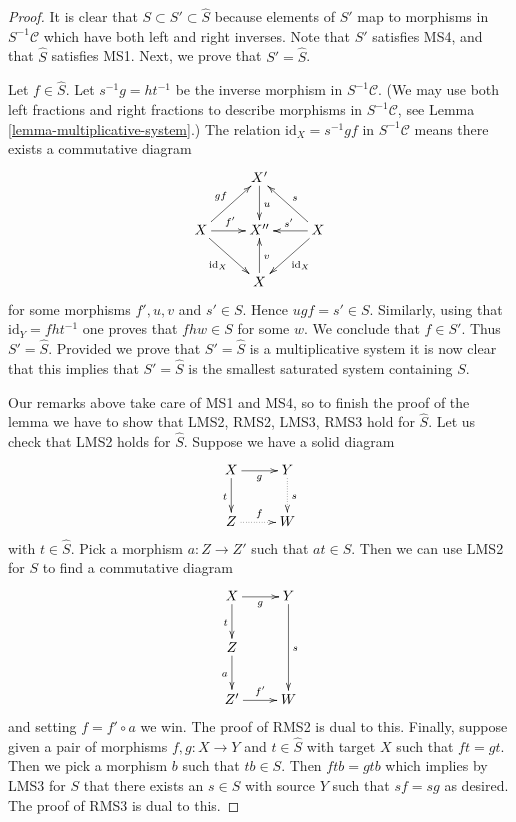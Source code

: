 \begin{proof}
It is clear that $S \subset S' \subset \hat S$ because elements of
$S'$ map to morphisms in $S^{-1}\mathcal{C}$ which have both left
and right inverses. Note that $S'$ satisfies MS4, and that
$\hat S$ satisfies MS1. Next, we prove that $S' = \hat S$.

\medskip\noindent
Let $f \in \hat S$. Let $s^{-1}g = ht^{-1}$ be the inverse morphism
in $S^{-1}\mathcal{C}$. (We may use both left fractions and right
fractions to describe morphisms in $S^{-1}\mathcal{C}$, see
Lemma \ref{lemma-multiplicative-system}.)
The relation $\text{id}_X = s^{-1}gf$ in $S^{-1}\mathcal{C}$ means
there exists a commutative diagram
$$
\xymatrix{
 & X' \ar[d]^u & \\
X \ar[ru]^{gf} \ar[r]^{f'} \ar[rd]_{\text{id}_X} &
X'' &
X \ar[lu]_s \ar[l]_{s'} \ar[ld]^{\text{id}_X} \\
& X \ar[u]_v &
}
$$
for some morphisms $f', u, v$ and $s' \in S$. Hence $ugf = s' \in S$.
Similarly, using that $\text{id}_Y = fht^{-1}$ one proves that
$fhw \in S$ for some $w$. We conclude that $f \in S'$. Thus
$S' = \hat S$. Provided we prove that $S' = \hat S$ is a
multiplicative system it is now clear that this implies that $S' = \hat S$
is the smallest saturated system containing $S$.

\medskip\noindent
Our remarks above take care of MS1 and MS4, so to finish the proof of the
lemma we have to show that LMS2, RMS2, LMS3, RMS3 hold for $\hat S$.
Let us check that LMS2 holds for $\hat S$. Suppose we have a solid diagram
$$
\xymatrix{
X \ar[d]_t \ar[r]_g & Y \ar@{..>}[d]^s \\
Z \ar@{..>}[r]^f & W
}
$$
with $t \in \hat S$. Pick a morphism $a : Z \to Z'$ such that
$at \in S$. Then we can use LMS2 for $S$ to find a commutative diagram
$$
\xymatrix{
X \ar[d]_t \ar[r]_g & Y \ar[dd]^s \\
Z \ar[d]_a \\
Z' \ar[r]^{f'} & W
}
$$
and setting $f = f' \circ a$ we win. The proof of RMS2 is dual to this.
Finally, suppose given a pair of morphisms $f, g : X \to Y$ and
$t \in \hat S$ with target $X$ such that $ft = gt$.
Then we pick a morphism $b$ such that $tb \in S$. Then
$ftb = gtb$ which implies by LMS3 for $S$ that there exists an $s \in S$
with source $Y$ such that $sf = sg$ as desired. The proof of
RMS3 is dual to this.
\end{proof}








